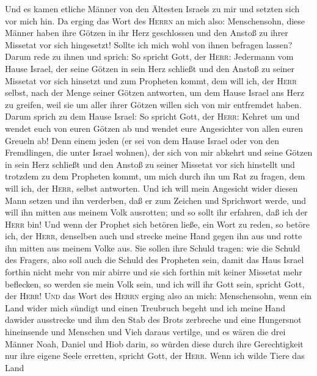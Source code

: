  Und es kamen etliche Männer von den Ältesten Israels zu
mir und setzten sich vor mich hin.  Da erging das Wort des
\textsc{Herrn} an mich also:  Menschensohn, diese Männer
haben ihre Götzen in ihr Herz geschlossen und den Anstoß zu ihrer
Missetat vor sich hingesetzt!  Sollte ich mich wohl von
ihnen befragen lassen? Darum rede zu ihnen und sprich: So spricht Gott,
der \textsc{Herr}: Jedermann vom Hause Israel, der seine Götzen in sein
Herz schließt und den Anstoß zu seiner Missetat vor sich hinsetzt und
zum Propheten kommt, dem will ich, der \textsc{Herr} selbst, nach der
Menge seiner Götzen antworten,  um dem Hause Israel ans
Herz zu greifen, weil sie um aller ihrer Götzen willen sich von mir
entfremdet haben.  Darum sprich zu dem Hause Israel: So
spricht Gott, der \textsc{Herr}: Kehret um und wendet euch von euren
Götzen ab und wendet eure Angesichter von allen euren Greueln ab!
 Denn einem jeden (er sei von dem Hause Israel oder von
den Fremdlingen, die unter Israel wohnen), der sich von mir abkehrt und
seine Götzen in sein Herz schließt und den Anstoß zu seiner Missetat vor
sich hinstellt und trotzdem zu dem Propheten kommt, um mich durch ihn um
Rat zu fragen, dem will ich, der \textsc{Herr}, selbst antworten.
 Und ich will mein Angesicht wider diesen Mann setzen und
ihn verderben, daß er zum Zeichen und Sprichwort werde, und will ihn
mitten aus meinem Volk ausrotten; und so sollt ihr erfahren, daß ich der
\textsc{Herr} bin!  Und wenn der Prophet sich betören
ließe, ein Wort zu reden, so betöre ich, der \textsc{Herr}, denselben
auch und strecke meine Hand gegen ihn aus und rotte ihn mitten aus
meinem Volke aus.  Sie sollen ihre Schuld tragen: wie die
Schuld des Fragers, also soll auch die Schuld des Propheten sein,
 damit das Haus Israel forthin nicht mehr von mir abirre
und sie sich forthin mit keiner Missetat mehr beflecken, so werden sie
mein Volk sein, und ich will ihr Gott sein, spricht Gott, der
\textsc{Herr}!  \textsc{Und} das Wort des \textsc{Herrn}
erging also an mich:  Menschensohn, wenn ein Land wider
mich sündigt und einen Treubruch begeht und ich meine Hand dawider
ausstrecke und ihm den Stab des Brots zerbreche und eine Hungersnot
hineinsende und Menschen und Vieh daraus vertilge,  und
es wären die drei Männer Noah, Daniel und Hiob darin, so würden diese
durch ihre Gerechtigkeit nur ihre eigene Seele erretten, spricht Gott,
der \textsc{Herr}.  Wenn ich wilde Tiere das Land
